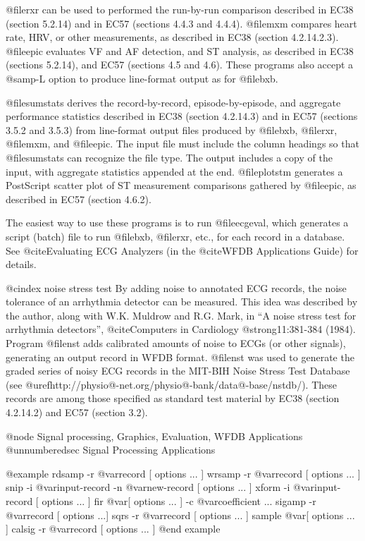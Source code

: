 {{{{{{{{@file{rxr} can be used to performed the run-by-run comparison described in EC38
(section 5.2.14) and in EC57 (sections 4.4.3 and 4.4.4).  @file{mxm} compares
heart rate, HRV, or other measurements, as described in EC38 (section
4.2.14.2.3).  @file{epic} evaluates VF and AF detection, and ST analysis, as
described in EC38 (sections 5.2.14), and EC57 (sections 4.5 and 4.6).  These
programs also accept a @samp{-L} option to produce line-format output as for
@file{bxb}.

@file{sumstats} derives the record-by-record, episode-by-episode, and
aggregate performance statistics described in EC38 (section 4.2.14.3) and in
EC57 (sections 3.5.2 and 3.5.3) from line-format output files produced
by @file{bxb}, @file{rxr}, @file{mxm}, and @file{epic}.  The input file
must include the column headings so that @file{sumstats} can recognize
the file type.  The output includes a copy of the input, with aggregate
statistics appended at the end.  @file{plotstm} generates a PostScript
scatter plot of ST measurement comparisons gathered by @file{epic}, as
described in EC57 (section 4.6.2).

The easiest way to use these programs is to run @file{ecgeval}, which
generates a script (batch) file to run @file{bxb}, @file{rxr}, etc., for
each record in a database.  See @cite{Evaluating ECG Analyzers} (in the
@cite{WFDB Applications Guide}) for details.

@cindex noise stress test
By adding noise to annotated ECG records, the noise tolerance of an
arrhythmia detector can be measured.  This idea was described by the
author, along with W.K. Muldrow and R.G. Mark, in ``A noise stress test
for arrhythmia detectors'', @cite{Computers in Cardiology}
@strong{11}:381-384 (1984).  Program @file{nst} adds calibrated amounts
of noise to ECGs (or other signals), generating an output record in WFDB
format.  @file{nst} was used to generate the graded series of noisy ECG
records in the MIT-BIH Noise Stress Test Database (see
@uref{http://physio@-net.org/physio@-bank/data@-base/nstdb/}).
These records are among those specified as standard test
material by EC38 (section 4.2.14.2) and EC57 (section 3.2).

@node     Signal processing, Graphics, Evaluation, WFDB Applications
@unnumberedsec Signal Processing Applications

@example
rdsamp -r @var{record [ options ... ]}
wrsamp -r @var{record [ options ... ]}
snip -i @var{input-record} -n @var{new-record [ options ... ]}
xform -i @var{input-record [ options ... ]}
fir @var{[ options ... ]} -c @var{coefficient ...}
sigamp -r @var{record [ options ...]}
sqrs -r @var{record [ options ... ]}
sample @var{[ options ... ]}
calsig -r @var{record [ options ... ]}
@end example

}}}}}}}}
